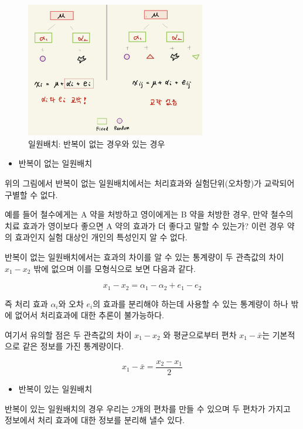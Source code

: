 \documentclass[
]{book}
\providecommand{\tightlist}{%
  \setlength{\itemsep}{0pt}\setlength{\parskip}{0pt}}
\theoremstyle{definition}
\theoremstyle{definition}
\theoremstyle{definition}
\theoremstyle{remark}
\begin{document}
\begin{figure}
\centering
\includegraphics[width=0.7\textwidth,height=\textheight]{confound1.png}
\caption{일원배치: 반복이 없는 경우와 있는 경우}
\end{figure}

\begin{itemize}
\tightlist
\item
  반복이 없는 일원배치
\end{itemize}

위의 그림에서 반복이 없는 일원배치에서는 처리효과와 실험단위(오차항)가 교락되어 구별할 수 없다.

예를 들어 철수에게는 A 약을 처방하고 영이에게는 B 약을 처방한 경우, 만약 철수의 치료 효과가 영이보다 좋으면 A 약의 효과가 더 좋다고 말할 수 있는가? 이런 경우 약의 효과인지 실험 대상인 개인의 특성인지 알 수 없다.

반복이 없는 일원배치에서는 효과의 차이를 알 수 있는 통계량이 두 관측값의 차이 \(x_1 - x_2\) 밖에 없으며 이를 모형식으로 보면 다음과 같다.

\[ x_1 - x_2 = \alpha_1 - \alpha_2 + e_1 - e_2 \]

즉 처리 효과 \(\alpha_i\)와 오차 \(e_i\)의 효과를 분리해야 하는데 사용할 수 있는 통계량이 하나 밖에 없어서 처리효과에 대한 추론이 불가능하다.

여기서 유의할 점은 두 관측값의 차이 \(x_1 - x_2\) 와 평균으로부터 편차 \(x_1 -\bar x\)는 기본적으로 같은 정보를 가진 통계량이다.

\[
x_1 -\bar x = \frac{x_2 - x_1}{2}
\]

\begin{itemize}
\tightlist
\item
  반복이 있는 일원배치
\end{itemize}

반복이 있는 일원배치의 경우 우리는 2개의 편차를 만들 수 있으며 두 편차가 가지고 정보에서 처리 효과에 대한 정보를 분리해 낼수 있다.
\end{document}
